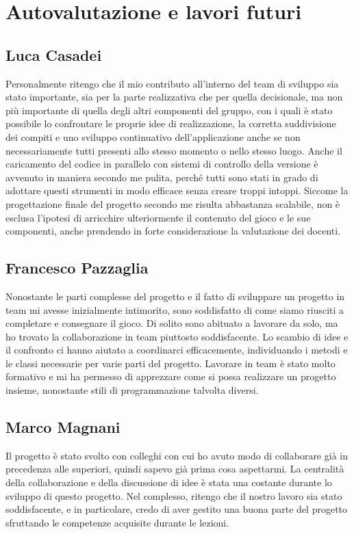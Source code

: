 \documentclass[a4paper,12pt]{report}
\begin{document}
\section{Autovalutazione e lavori futuri}

\subsection*{Luca Casadei}
Personalmente ritengo che il mio contributo all'interno del team di sviluppo sia stato importante, sia per la parte realizzativa che per quella decisionale, ma non più importante di quella degli altri componenti del gruppo, con i quali è stato possibile lo confrontare le proprie idee di realizzazione, la corretta suddivisione dei compiti e uno sviluppo continuativo dell'applicazione anche se non necessariamente tutti presenti allo stesso momento o nello stesso luogo. Anche il caricamento del codice in parallelo con sistemi di controllo della versione è avvenuto in maniera secondo me pulita, perché tutti sono stati in grado di adottare questi strumenti in modo efficace senza creare troppi intoppi. Siccome la progettazione finale del progetto secondo me risulta abbastanza scalabile, non è esclusa l'ipotesi di arricchire ulteriormente il contenuto del gioco e le sue componenti, anche prendendo in forte considerazione la valutazione dei docenti.

\subsection*{Francesco Pazzaglia}

Nonostante le parti complesse del progetto e il fatto di sviluppare un progetto in team mi avesse inizialmente intimorito, sono soddisfatto di come siamo riusciti a completare e consegnare il gioco. Di solito sono abituato a lavorare da solo, ma ho trovato la collaborazione in team piuttosto soddisfacente. Lo scambio di idee e il confronto ci hanno aiutato a coordinarci efficacemente, individuando i metodi e le classi necessarie per varie parti del progetto. Lavorare in team è stato molto formativo e mi ha permesso di apprezzare come si possa realizzare un progetto insieme, nonostante stili di programmazione talvolta diversi.

\subsection*{Marco Magnani}
Il progetto è stato svolto con colleghi con cui ho avuto modo di collaborare già in precedenza alle superiori, quindi sapevo già prima cosa aspettarmi. La centralità della collaborazione e della discussione di idee è stata una costante durante lo sviluppo di questo progetto. Nel complesso, ritengo che il nostro lavoro sia stato soddisfacente, e in particolare, credo di aver gestito una buona parte del progetto sfruttando le competenze acquisite durante le lezioni.
\end{document}
